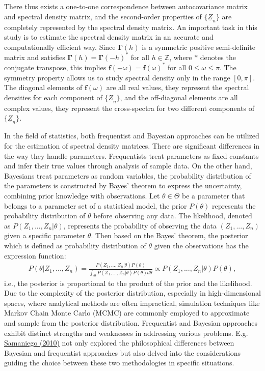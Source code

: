 \documentclass[12pt,a4paper]{article}
\begin{document}
There thus exists a one-to-one correspondence between autocovariance matrix and spectral density matrix, and the second-order properties of $\{\underline Z_{n}\}$ are completely represented by the spectral density matrix. An important task in this study is to estimate the spectral density matrix in an accurate and computationally efficient way. Since $\mathbf{\Gamma}(h)$ is a symmetric positive semi-definite matrix and satisfies $\mathbf{\Gamma}(h) = \mathbf{\Gamma}(-h)^*$ for all $h\in \mathbb{Z}$, where $*$ denotes the conjugate transpose, this implies $\bm{f}(-\omega) = \bm{f}(\omega)^*$ for all $0\leq \omega\leq \pi$. The symmetry property allows us to study spectral density only in the range $[0, \pi]$. The diagonal elements of $\bm{f}(\omega)$ are all real values, they represent the spectral densities for each component of $\{\underline Z_{n}\}$, and the off-diagonal elements are all complex values, they represent the cross-spectra for two different components of $\{\underline Z_{n}\}$.

In the field of statistics, both frequentist and Bayesian approaches can be utilized for the estimation of spectral density matrices. There are significant differences in the way they handle parameters. Frequentists treat parameters as fixed constants and infer their true values through analysis of sample data. On the other hand, Bayesians treat parameters as random variables, the probability distribution of the parameters is constructed by Bayes' theorem to express the uncertainty, combining prior knowledge with observations. Let $\theta \in \Theta$ be a parameter that belongs to a parameter set of a statistical model, the prior $P(\theta)$ represents the probability distribution of $\theta$ before observing any data. The likelihood, denoted as $P(Z_1, ..., Z_n|\theta)$, represents the probability of observing the data $(Z_1, ..., Z_n)$ given a specific parameter $\theta$. Then based on the Bayes' theorem, the posterior which is defined as probability distribution of $\theta$ given the observations has the expression function:
\begin{align*}
P(\theta|Z_1, ..., Z_n)= \frac{P(Z_1, ..., Z_n|\theta)P(\theta)}{\int_{\Theta} P(Z_1, ..., Z_n|\theta)P(\theta) d\theta} \propto P(Z_1, ..., Z_n|\theta)P(\theta),
\end{align*}
i.e., the posterior is proportional to the product of the prior and the likelihood. Due to the complexity of the posterior distribution, especially in high-dimensional spaces, where analytical methods are often impractical, simulation techniques like Markov Chain Monte Carlo (MCMC) are commonly employed to approximate and sample from the posterior distribution. Frequentist and Bayesian approaches exhibit distinct strengths and weaknesses in addressing various problems. E.g. \hyperref[Samaniego (2010)]{Samaniego (2010)} not only explored the philosophical differences between Bayesian and frequentist approaches but also delved into the considerations guiding the choice between these two methodologies in specific situations.
\end{document}
